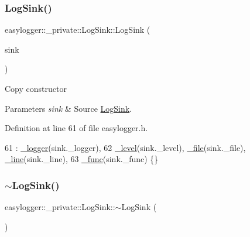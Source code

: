 \subsubsection{\texorpdfstring{Log\+Sink()}{LogSink()}\hspace{0.1cm}{\footnotesize\ttfamily [2/2]}}
{\footnotesize\ttfamily easylogger\+::\+\_\+private\+::\+Log\+Sink\+::\+Log\+Sink (\begin{DoxyParamCaption}\item[{const \mbox{\hyperlink{classeasylogger_1_1__private_1_1_log_sink}{Log\+Sink}} \&}]{sink }\end{DoxyParamCaption})\hspace{0.3cm}{\ttfamily [inline]}}

Copy constructor


\begin{DoxyParams}{Parameters}
{\em sink} & Source \mbox{\hyperlink{classeasylogger_1_1__private_1_1_log_sink}{Log\+Sink}}. \\
\hline
\end{DoxyParams}


Definition at line 61 of file easylogger.\+h.


\begin{DoxyCode}
61                                          : \mbox{\hyperlink{classeasylogger_1_1__private_1_1_log_sink_a60f3bf0555fd5c7d97b27749d87f125b}{\_logger}}(sink.\_logger),
62             \mbox{\hyperlink{classeasylogger_1_1__private_1_1_log_sink_aa95e04bfd9dddc7bb38fcfb9b2033d91}{\_level}}(sink.\_level), \mbox{\hyperlink{classeasylogger_1_1__private_1_1_log_sink_a9496a68363124d15396253627d2702bb}{\_file}}(sink.\_file), \mbox{\hyperlink{classeasylogger_1_1__private_1_1_log_sink_a66cce9a59d42737916fba00a549fd4ef}{\_line}}(sink.\_line),
63             \mbox{\hyperlink{classeasylogger_1_1__private_1_1_log_sink_a147321aae0346917642528aa81aedf32}{\_func}}(sink.\_func) \{\}
\end{DoxyCode}
\mbox{\label{classeasylogger_1_1__private_1_1_log_sink_a73dbb1df32e0ec8b6c6def939cae7b5c}} 
\subsubsection{\texorpdfstring{$\sim$\+Log\+Sink()}{~LogSink()}}
{\footnotesize\ttfamily easylogger\+::\+\_\+private\+::\+Log\+Sink\+::$\sim$\+Log\+Sink (\begin{DoxyParamCaption}{ }\end{DoxyParamCaption})}



